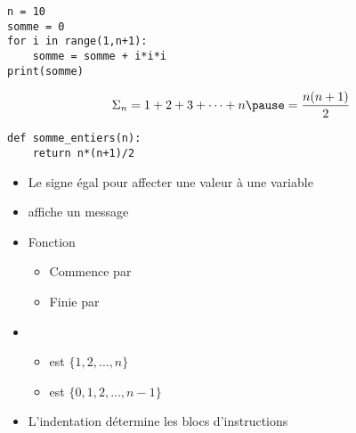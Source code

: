 \begin{frame}[fragile]

\begin{algo}
\begin{lstlisting}
n = 10
somme = 0
for i in range(1,n+1):
    somme = somme + i*i*i
print(somme)
\end{lstlisting}  
\end{algo}

\pause

$$\Sigma_n = 1+2+3+\cdots+n \pause =\frac{n(n+1)}{2}$$

\pause

\begin{algo}
\begin{lstlisting}
def somme_entiers(n):
    return n*(n+1)/2
\end{lstlisting}  
\end{algo}

\end{frame}


\begin{frame}[fragile]

\begin{itemize}
  \item Le signe égal \codeinline{=} pour affecter une valeur à une variable
\pause   
  \item {} affiche un message

\pause   
  \item Fonction 
  \begin{itemize}
    \item Commence par  
 \pause
    \item Finie par 
  \end{itemize}     
\pause
  \item
   \begin{itemize}
    \item {} est $\{1,2,\ldots,n\}$
\pause
    \item {} est $\{0,1,2,\ldots,n-1\}$
  \end{itemize} 
\pause
  \item L'indentation détermine les blocs d'instructions
\end{itemize}
\end{frame}  
 

